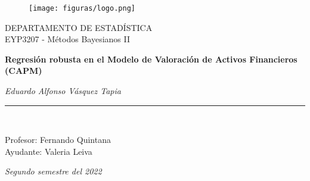 \begin{titlepage}
\begin{center}

\vspace*{-0.7in}
\begin{figure}[htb]
\begin{center}
\texttt{[image: figuras/logo.png]}
\end{center}
\end{figure}
\Large DEPARTAMENTO DE ESTADÍSTICA\\

\Large EYP3207 - Métodos Bayesianos II\\
\vspace*{1in}

\begin{large}

\Huge \textbf{Regresión robusta en el Modelo de Valoración de Activos Financieros (CAPM)} \\
\end{large}
\vspace*{1.2in}

\vspace*{0.5in}
\begin{large}
\textit{Eduardo Alfonso Vásquez Tapia}\\
\end{large}
\vspace*{0.5in}
\rule{80mm}{0.1mm}\\
\vspace*{0.5in}
\begin{large}
Profesor: Fernando Quintana \\
Ayudante: Valeria Leiva \\
\vspace*{0.5in}



\textit{Segundo semestre del 2022}
\end{large}
\end{center}
\end{titlepage}